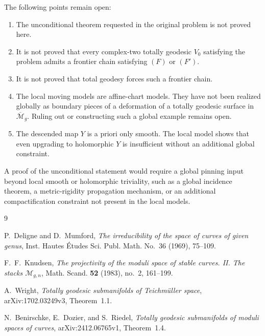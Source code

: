 \documentclass[12pt]{article}
\theoremstyle{plain}
\theoremstyle{definition}
\theoremstyle{remark}
\newcommand{\M}{\mathcal M}
\newcommand{\bMg}{\overline{\M}_g}
\begin{document}
The following points remain open:
\begin{enumerate}[label=(OP\arabic*)]
  \item The unconditional theorem requested in the original problem is not proved here.
  \item It is not proved that every complex-two totally geodesic \(V_0\) satisfying the problem admits a frontier chain satisfying \((F)\) or \((F')\).
  \item It is not proved that total geodesy forces such a frontier chain.
  \item The local moving models are affine-chart models.  They have not been realized globally as boundary pieces of a deformation of a totally geodesic surface in \(\bMg\).  Ruling out or constructing such a global example remains open.
  \item The descended map \(Y\) is a priori only smooth.  The local model shows that even upgrading to holomorphic \(Y\) is insufficient without an additional global constraint.
\end{enumerate}

A proof of the unconditional statement would require a global pinning input beyond local smooth or holomorphic triviality, such as a global incidence theorem, a metric-rigidity propagation mechanism, or an additional compactification constraint not present in the local models.

\begin{thebibliography}{9}

P.~Deligne and D.~Mumford,
\newblock \emph{The irreducibility of the space of curves of given genus},
\newblock Inst. Hautes \'Etudes Sci. Publ. Math. No.~36 (1969), 75--109.

F.~F.~Knudsen,
\newblock \emph{The projectivity of the moduli space of stable curves. II. The stacks \(\M_{g,n}\)},
\newblock Math. Scand. \textbf{52} (1983), no.~2, 161--199.

A.~Wright,
\newblock \emph{Totally geodesic submanifolds of Teichm\"uller space},
\newblock arXiv:1702.03249v3, Theorem~1.1.

N.~Benirschke, E.~Dozier, and S.~Riedel,
\newblock \emph{Totally geodesic submanifolds of moduli spaces of curves},
\newblock arXiv:2412.06765v1, Theorem~1.4.

\end{thebibliography}
\end{document}

